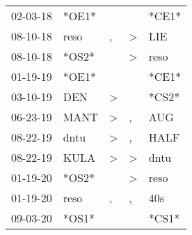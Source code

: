 \begin{supertabular}{p{0.07\textwidth}p{0.06\textwidth}p{0.02\textwidth}p{0.02\textwidth}p{0.06\textwidth}}
          02-03-18\textsuperscript{} &                            *OE1* &                  &                  &                            *CE1* \\
          08-10-18\textsuperscript{} &           reso\textsuperscript{} &                , &     \textgreater &            LIE\textsuperscript{} \\
          08-10-18\textsuperscript{} &                            *OS2* &                  &     \textgreater &           reso\textsuperscript{} \\
          01-19-19\textsuperscript{} &                            *OE1* &                  &                  &                            *CE1* \\
          03-10-19\textsuperscript{} &            DEN\textsuperscript{} &     \textgreater &                  &                            *CS2* \\
          06-23-19\textsuperscript{} &           MANT\textsuperscript{} &     \textgreater &                , &            AUG\textsuperscript{} \\
          08-22-19\textsuperscript{} &           dntu\textsuperscript{} &     \textgreater &                , &           HALF\textsuperscript{} \\
          08-22-19\textsuperscript{} &           KULA\textsuperscript{} &     \textgreater &     \textgreater &           dntu\textsuperscript{} \\
          01-19-20\textsuperscript{} &                            *OS2* &                  &     \textgreater &           reso\textsuperscript{} \\
          01-19-20\textsuperscript{} &           reso\textsuperscript{} &                , &                , &            40s\textsuperscript{} \\
          09-03-20\textsuperscript{} &                            *OS1* &                  &                  &                            *CS1* \\
\end{supertabular}
